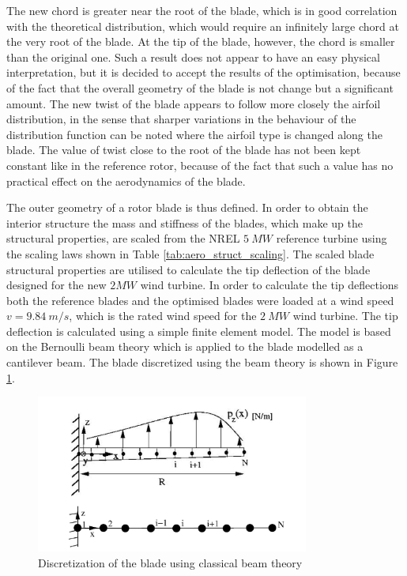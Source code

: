 The new chord is greater near the root of the blade, which is in good correlation with the theoretical distribution, which would require an infinitely large chord at the very root of the blade. At the tip of the blade, however, the chord is smaller than the original one. Such a result does not appear to have an easy physical interpretation, but it is decided to accept the results of the optimisation, because of the fact that the overall geometry of the blade is not change but a significant amount. 
The new twist of the blade appears to follow more closely the airfoil distribution, in the sense that sharper variations in the behaviour of the distribution function can be noted where the airfoil type is changed along the blade. The value of twist close to the root of the blade has not been kept constant like in the reference rotor, because of the fact that such a value has no practical effect on the aerodynamics of the blade.


The outer geometry of a rotor blade is thus defined. In order to obtain the interior structure the mass and stiffness of the blades, which make up the structural properties, are scaled from the NREL $5\ MW$ reference turbine using the scaling laws shown in Table \ref{tab:aero_struct_scaling}. The scaled blade structural properties are utilised to calculate the tip deflection of the blade designed for the new $2 MW$ wind turbine. In order to calculate the tip deflections both the reference blades and the optimised blades were loaded at a wind speed $v=9.84\ m/s$, which is the rated wind speed for the $2\ MW$ wind turbine. The tip deflection is calculated using a simple finite element model. The model is based on the Bernoulli beam theory which is applied to the blade modelled as a cantilever beam\cite{Bispl}. The blade discretized using the beam theory is shown in Figure \ref{fig:beam_theory}.

\begin{figure}[H]
\centering
\includegraphics[width=0.8\textwidth]{Images/beam_theory.PNG} 
\caption{Discretization of the blade using classical beam theory \cite{DTU_hansen}}\label{fig:beam_theory}
\end{figure}

